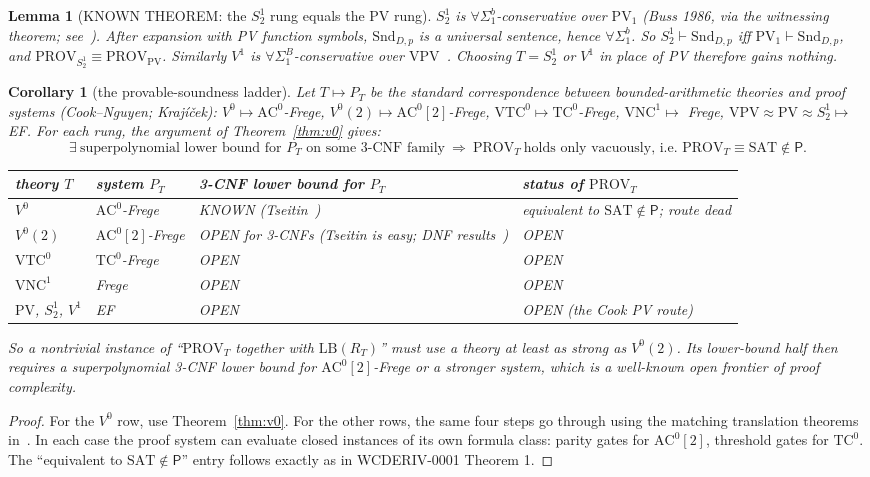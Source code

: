\documentclass[11pt]{article}
\newtheorem{lemma}[theorem]{Lemma}
\newtheorem{corollary}[theorem]{Corollary}
\theoremstyle{definition}
\newcommand{\SAT}{\mathrm{SAT}}
\newcommand{\Snd}{\mathrm{Snd}}
\begin{document}
\begin{lemma}[KNOWN THEOREM: the $S^1_2$ rung equals the PV rung]\label{lem:s12}
$S^1_2$ is $\forall\Sigma^b_1$-conservative over $\mathrm{PV}_1$ (Buss 1986, via the witnessing theorem;
see~\cite{Bus86,KP89}). After expansion with PV function symbols, $\Snd_{D,p}$ is a universal sentence,
hence $\forall\Sigma^b_1$. So $S^1_2\vdash\Snd_{D,p}$ iff $\mathrm{PV}_1\vdash\Snd_{D,p}$, and
$\mathrm{PROV}_{S^1_2}\equiv\mathrm{PROV}_{\mathrm{PV}}$. Similarly $V^1$ is $\forall\Sigma^B_1$-conservative
over $\mathrm{VPV}$~\cite{CN10}. Choosing $T=S^1_2$ or $V^1$ in place of PV therefore gains nothing.
\end{lemma}

\begin{corollary}[the provable-soundness ladder]\label{cor:ladder}
Let $T\mapsto P_T$ be the standard correspondence between bounded-arithmetic theories and proof systems
(Cook--Nguyen; Krajíček):
$V^0\mapsto\mathrm{AC}^0$-Frege, $V^0(2)\mapsto\mathrm{AC}^0[2]$-Frege, $\mathrm{VTC}^0\mapsto\mathrm{TC}^0$-Frege,
$\mathrm{VNC}^1\mapsto$ Frege, $\mathrm{VPV}\approx\mathrm{PV}\approx S^1_2\mapsto$ EF. For each rung, the argument of
Theorem~\ref{thm:v0} gives:
\[
\exists\ \text{superpolynomial lower bound for $P_T$ on some 3-CNF family}
\ \Longrightarrow\ \mathrm{PROV}_T\ \text{holds only vacuously, i.e. }\mathrm{PROV}_T\equiv\SAT\notin\mathsf P .
\]
\begin{center}
\begin{tabular}{@{}llll@{}}
\toprule
theory $T$ & system $P_T$ & 3-CNF lower bound for $P_T$ & status of $\mathrm{PROV}_T$\\
\midrule
$V^0$ & $\mathrm{AC}^0$-Frege & KNOWN (Tseitin~\cite{BS02,PRST16}) & equivalent to $\SAT\notin\mathsf P$; route dead\\
$V^0(2)$ & $\mathrm{AC}^0[2]$-Frege & OPEN for 3-CNFs (Tseitin is easy; DNF results~\cite{LST25}) & OPEN\\
$\mathrm{VTC}^0$ & $\mathrm{TC}^0$-Frege & OPEN & OPEN\\
$\mathrm{VNC}^1$ & Frege & OPEN & OPEN\\
$\mathrm{PV}$, $S^1_2$, $V^1$ & EF & OPEN & OPEN (the Cook PV route)\\
\bottomrule
\end{tabular}
\end{center}
So a nontrivial instance of ``$\mathrm{PROV}_T$ together with $\mathrm{LB}(R_T)$'' must use a theory at least as strong as
$V^0(2)$. Its lower-bound half then requires a superpolynomial 3-CNF lower bound for
$\mathrm{AC}^0[2]$-Frege or a stronger system, which is a well-known open frontier of proof complexity.
\end{corollary}
\begin{proof}
For the $V^0$ row, use Theorem~\ref{thm:v0}. For the other rows, the same four steps go through using the
matching translation theorems in~\cite{CN10}. In each case the proof system can evaluate closed
instances of its own formula class: parity gates for $\mathrm{AC}^0[2]$, threshold gates for $\mathrm{TC}^0$.
The ``equivalent to $\SAT\notin\mathsf P$'' entry follows exactly as in WCDERIV-0001 Theorem 1.
\end{proof}
\end{document}
